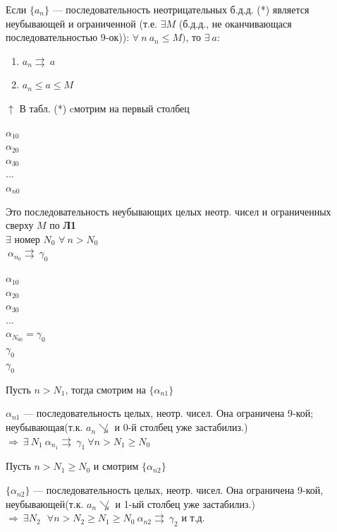 \documentclass{article}
\begin{document}
    Если \( \{a_n\} \) --- последовательность неотрицательных б.д.д. (*) является неубывающей и ограниченной (т.е. \( \exists M \) (б.д.д., не оканчивающася последовательностью 9-ок)): \( \forall\ n\ a_n \leq M) \), то \( \exists\ a \):
    
    \begin{enumerate}
    	\item \(a_n \rightrightarrows\ a\)  

    	\item \(a_n \leq a \leq M\)
	\end{enumerate}
    
    \( \uparrow \) В табл. (*) cмотрим на первый столбец

    \( \alpha_{10} \)\\
    \( \alpha_{20} \)\\
    \( \alpha_{30} \)\\
    ...\\
    \( \alpha_{n0} \)

    Это последовательность неубывающих целых неотр. чисел и ограниченных сверху \(M\) по \textbf{Л1}\\
    \(\exists \) номер \(N_0\) \: \(\forall\ n > N_0\)\\
    \(\ \alpha_{n_0} \rightrightarrows\ \gamma_0\)
    
    \( \alpha_{10} \)\\
    \( \alpha_{20} \)\\
    \( \alpha_{30} \)\\
    ...\\
    \( \alpha_{N_00} = \gamma_0 \)\\
    \(\gamma_0\)\\
    \(\gamma_0\)

    Пусть \(n > N_1\), тогда смотрим на \(\{\alpha_{n1}\}\)

    \(\alpha_{n1}\) --- последовательность целых, неотр. чисел. Она ограничена 9-кой; неубывающая(т.к. \(a_n \not\searrow\) и 0-й столбец уже застабилиз.) \(\Rightarrow \ \exists\ N_1 \ \alpha_{n_1} \rightrightarrows\ \gamma_1 \ \forall n > N_1 \geq N_0\)

    Пусть \( n > N_1 \geq N_0 \) и смотрим \( \{ \alpha_{n2} \} \)
    
    \(\{\alpha_{n2}\}\) --- последовательность целых, неотр. чисел. Она ограничена 9-кой, неубывающей(т.к. \(a_n \not\searrow\) и 1-ый столбец уже застабилиз.) \(\Rightarrow \ \exists N_2 \ \: \ \forall n > N_2 \geq N_1 \geq N_0 \ \alpha_{n2} \rightrightarrows\ \gamma_2\) и т.д.
\end{document}
